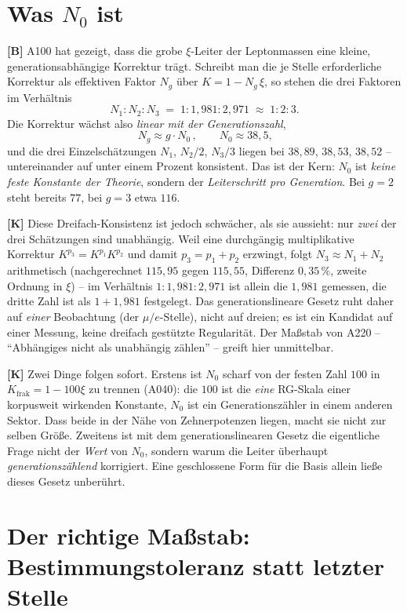 \section{Was $N_0$ ist}

\textbf{[B]} A100 hat gezeigt, dass die grobe $\xi$-Leiter der Leptonmassen eine
kleine, generationsabhängige Korrektur trägt. Schreibt man die je Stelle
erforderliche Korrektur als effektiven Faktor $N_g$ über $K = 1 - N_g\,\xi$, so
stehen die drei Faktoren im Verhältnis
\[
  N_1 : N_2 : N_3 \;=\; 1 : 1{,}981 : 2{,}971 \;\approx\; 1 : 2 : 3 .
\]
Die Korrektur wächst also \emph{linear mit der Generationszahl},
\[
  \boxed{\,N_g \approx g \cdot N_0\,}, \qquad
  N_0 \approx 38{,}5 ,
\]
und die drei Einzelschätzungen $N_1$, $N_2/2$, $N_3/3$ liegen bei $38{,}89$,
$38{,}53$, $38{,}52$ -- untereinander auf unter einem Prozent konsistent. Das ist
der Kern: $N_0$ ist \emph{keine feste Konstante der Theorie}, sondern der
\emph{Leiterschritt pro Generation}. Bei $g=2$ steht bereits $77$, bei $g=3$
etwa $116$.

\textbf{[K]} Diese Dreifach-Konsistenz ist jedoch schwächer, als sie aussieht:
nur \emph{zwei} der drei Schätzungen sind unabhängig. Weil eine durchgängig
multiplikative Korrektur $K^{p_3} = K^{p_1}K^{p_2}$ und damit $p_3 = p_1 + p_2$
erzwingt, folgt $N_3 \approx N_1 + N_2$ arithmetisch (nachgerechnet $115{,}95$
gegen $115{,}55$, Differenz $0{,}35\,\%$, zweite Ordnung in $\xi$) -- im
Verhältnis $1{:}1{,}981{:}2{,}971$ ist allein die $1{,}981$ gemessen, die dritte
Zahl ist als $1 + 1{,}981$ festgelegt. Das generationslineare Gesetz ruht daher
auf \emph{einer} Beobachtung (der $\mu/e$-Stelle), nicht auf dreien; es ist ein
Kandidat auf einer Messung, keine dreifach gestützte Regularität. Der Maßstab von A220 -- \enquote{Abhängiges nicht als
unabhängig zählen} -- greift hier unmittelbar.

\textbf{[K]} Zwei Dinge folgen sofort. Erstens ist $N_0$ scharf von der festen
Zahl $100$ in $K_\text{frak} = 1 - 100\xi$ zu trennen (A040): die $100$ ist die
\emph{eine} RG-Skala einer korpusweit wirkenden Konstante, $N_0$ ist ein
Generationszähler in einem anderen Sektor. Dass beide in der Nähe von
Zehnerpotenzen liegen, macht sie nicht zur selben Größe. Zweitens ist mit dem
generationslinearen Gesetz die eigentliche Frage nicht der \emph{Wert} von
$N_0$, sondern warum die Leiter überhaupt \emph{generationszählend} korrigiert.
Eine geschlossene Form für die Basis allein ließe dieses Gesetz unberührt.

\section{Der richtige Maßstab: Bestimmungstoleranz statt letzter Stelle}

